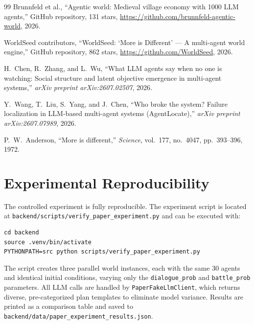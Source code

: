 \documentclass[11pt]{article}
\begin{document}
\begin{thebibliography}{99}
Brunnfeld et al.,
``Agentic world: Medieval village economy with 1000 LLM agents,''
GitHub repository, 131 stars, \url{https://github.com/brunnfeld-agentic-world}, 2026.

WorldSeed contributors,
``WorldSeed: `More is Different' --- A multi-agent world engine,''
GitHub repository, 862 stars, \url{https://github.com/WorldSeed}, 2026.

H.~Chen, R.~Zhang, and L.~Wu,
``What LLM agents say when no one is watching: Social structure and latent objective emergence in multi-agent systems,''
\emph{arXiv preprint arXiv:2607.02507}, 2026.

Y.~Wang, T.~Liu, S.~Yang, and J.~Chen,
``Who broke the system? Failure localization in LLM-based multi-agent systems (AgentLocate),''
\emph{arXiv preprint arXiv:2607.07989}, 2026.

P.~W.~Anderson,
``More is different,''
\emph{Science}, vol.~177, no.~4047, pp.~393--396, 1972.

\end{thebibliography}

\appendix
\section{Experimental Reproducibility}

The controlled experiment is fully reproducible.
The experiment script is located at \texttt{backend/scripts/verify\_paper\_experiment.py} and can be executed with:

\begin{verbatim}
cd backend
source .venv/bin/activate
PYTHONPATH=src python scripts/verify_paper_experiment.py
\end{verbatim}

The script creates three parallel world instances, each with the same 30 agents and identical initial conditions, varying only the \texttt{dialogue\_prob} and \texttt{battle\_prob} parameters.
All LLM calls are handled by \texttt{PaperFakeLlmClient}, which returns diverse, pre-categorized plan templates to eliminate model variance.
Results are printed as a comparison table and saved to \texttt{backend/data/paper\_experiment\_results.json}.
\end{document}
